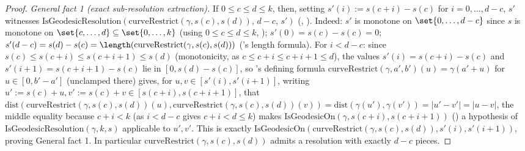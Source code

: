 \begin{proof}
  \emph{General fact 1 (exact sub-resolution extraction).} If $0 \le c \le d \le k$, then, setting
  $s'(i) := s(c+i)-s(c)$ for $i=0,\dots,d-c$, $s'$ witnesses
  $\mathrm{IsGeodesicResolution}(\mathrm{curveRestrict}(\gamma,s(c),s(d)),\,d-c,\,s')$
  (, ). Indeed: $s'$ is monotone on
  $\set{0,\dots,d-c}$ since $s$ is monotone on $\set{c,\dots,d}\subseteq\set{0,\dots,k}$
  (using $0\le c\le d\le k$, ); $s'(0)=s(c)-s(c)=0$; $s'(d-c) =
  s(d)-s(c) = \length(\mathrm{curveRestrict}(\gamma,s(c),s(d)))$ ('s length
  formula). For $i<d-c$: since $s(c)\le s(c+i)\le s(c+i+1)\le s(d)$ (monotonicity, as
  $c\le c+i\le c+i+1\le d$), the values $s'(i)=s(c+i)-s(c)$ and $s'(i+1)=s(c+i+1)-s(c)$ lie in
  $[0,s(d)-s(c)]$, so 's defining formula $\mathrm{curveRestrict}(\gamma,a',b')(u)
  = \gamma(a'+u)$ for $u \in [0,b'-a']$ (unclamped there) gives, for $u,v\in[s'(i),s'(i+1)]$, writing
  $u':=s(c)+u,v':=s(c)+v \in [s(c+i),s(c+i+1)]$, that $\mathrm{dist}(\mathrm{curveRestrict}(\gamma,
  s(c),s(d))(u),\mathrm{curveRestrict}(\gamma,s(c),s(d))(v)) = \mathrm{dist}(\gamma(u'),\gamma(v')) =
  |u'-v'|=|u-v|$, the middle equality because $c+i<k$ (as $i<d-c$ gives $c+i<d\le k$) makes
  $\mathrm{IsGeodesicOn}(\gamma,s(c+i),s(c+i+1))$ () a hypothesis of
  $\mathrm{IsGeodesicResolution}(\gamma,k,s)$ applicable to $u',v'$. This is exactly
  $\mathrm{IsGeodesicOn}(\mathrm{curveRestrict}(\gamma,s(c),s(d)),s'(i),s'(i+1))$, proving General
  fact 1. In particular $\mathrm{curveRestrict}(\gamma,s(c),s(d))$ admits a resolution with exactly
  $d-c$ pieces.


\end{proof}
